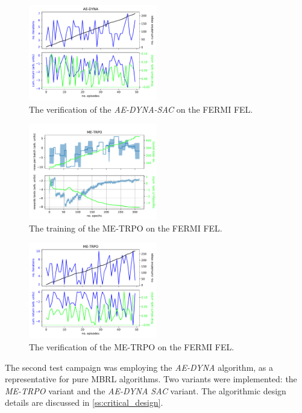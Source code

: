 \documentclass[
reprint,
amsmath,amssymb,amsfonts,clevref,
aps,
prstab,
]{revtex4-2}
\begin{document}
	\begin{figure}
		\centering
		\includegraphics*[width=0.5\textwidth]{Figures/AE-DYNA_verification.pdf}
		\caption{The verification of the \emph{AE-DYNA-SAC} on the FERMI FEL.}
		\label{fig:AE-DYNA_verification}
	\end{figure}
	\begin{figure}
		\centering
		\includegraphics*[width=0.5\textwidth]{Figures/ME-TRPO_observables.pdf}
		\caption{The training of the ME-TRPO on the FERMI FEL.}
		\label{fig:ME-TRPO_observables}
	\end{figure}
	\begin{figure}
		\centering
		\includegraphics*[width=0.5\textwidth]{Figures/ME-TRPO_verification.pdf}
		\caption{The verification of the ME-TRPO on the FERMI FEL.}
		\label{fig:ME-TRPO_verification}
	\end{figure}
	The second test campaign was employing the \emph{AE-DYNA} algorithm, as a representative for pure MBRL algorithms. Two variants were implemented: the \emph{ME-TRPO} variant and the \emph{AE-DYNA SAC} variant. The algorithmic design details are discussed in \cref{ss:critical_design}. 
\end{document}
